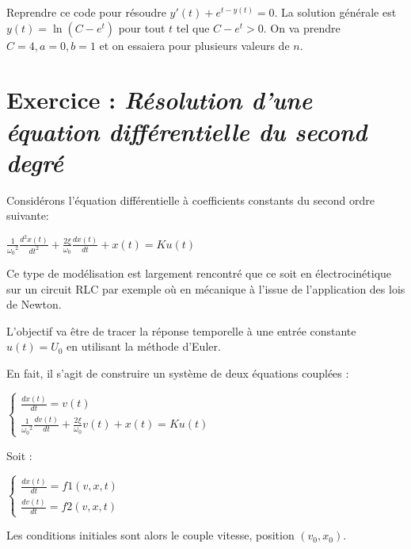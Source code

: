 \documentclass[10pt]{article}
\begin{document}
Reprendre ce code pour r\'esoudre 
$y'(t)+e^{t-y(t)}=0.$ La solution g\'en\'erale est $y(t)=\ln(C-e^t)$ pour tout $t$ tel que $C-e^t>0.$ On va prendre $C=4,a=0,b=1$ et on essaiera pour plusieurs valeurs de $n.$

\section{Exercice : {\it R\'esolution d'une \'equation diff\'erentielle du second degr\'e}}

Consid\'erons l'\'equation diff\'erentielle \`a coefficients constants du second ordre suivante:

\begin{center}
$\frac{1}{{\omega_0}^2} \frac{d^2 x(t)}{dt^2} + \frac{2 \xi}{\omega_0} \frac{dx(t)}{dt} + x(t)=K u(t)$
\end{center}


Ce type de mod\'elisation est largement rencontr\'e que ce soit en \'electrocin\'etique sur un circuit RLC par exemple o\`u en m\'ecanique \`a l'issue de l'application des lois de Newton.

L'objectif va \^etre de tracer la r\'eponse temporelle \`a une entr\'ee constante $u(t)=U_0$ en utilisant la m\'ethode d'Euler.


En fait, il s'agit de construire un syst\`eme de deux \'equations coupl\'ees :


$\left\lbrace 
\begin{array}{lcl} 
\frac{dx(t)}{dt}=v(t)\\ 
\frac{1}{{\omega_0}^2} \frac{d v(t)}{dt} + \frac{2 \xi}{\omega_0} v(t) + x(t)=K u(t) 
\end{array}\right.$


Soit :

$\left\lbrace 
\begin{array}{lcl} 
\frac{dx(t)}{dt}=f1(v,x,t)\\
\frac{dv(t)}{dt}=f2(v,x,t)
\end{array}\right.$

Les conditions initiales sont alors le couple vitesse, position $(v_0,x_0)$.
\end{document}
